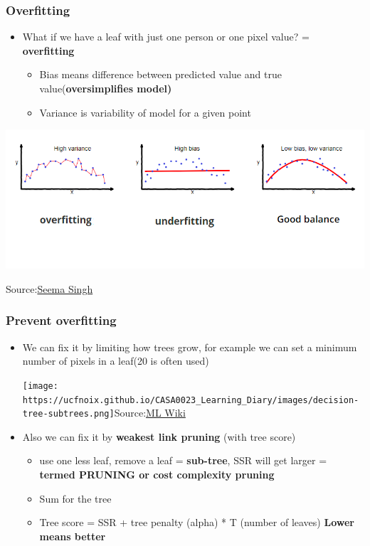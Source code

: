\documentclass[
  letterpaper,
  DIV=11,
  numbers=noendperiod]{scrreprt}
\begin{document}
\hypertarget{overfitting}{%
\subsubsection{Overfitting}\label{overfitting}}

\begin{itemize}
\item
  What if we have a leaf with just one person or one pixel value? =
  \textbf{overfitting}

  \begin{itemize}
  \item
    Bias means difference between predicted value and true
    value(\textbf{oversimplifies model)}
  \item
    Variance is variability of model for a given point
  \end{itemize}
\end{itemize}

\includegraphics{./images/paste-F0B4E05F.png}

Source:\href{https://towardsdatascience.com/understanding-the-bias-variance-tradeoff-165e6942b229}{Seema
Singh}

\hypertarget{prevent-overfitting}{%
\subsubsection{Prevent overfitting}\label{prevent-overfitting}}

\begin{itemize}
\item
  We can fix it by limiting how trees grow, for example we can set a
  minimum number of pixels in a leaf(20 is often used)

  \texttt{[image: https://ucfnoix.github.io/CASA0023\_Learning\_Diary/images/decision-tree-subtrees.png]}Source:\href{http://mlwiki.org/index.php/Cost-Complexity_Pruning}{ML
  Wiki}
\item
  Also we can fix it by \textbf{weakest link pruning} (with tree score)

  \begin{itemize}
  \item
    use one less leaf, remove a leaf = \textbf{sub-tree}, SSR will get
    larger = \textbf{termed PRUNING or cost complexity pruning}
  \item
    Sum for the tree
  \item
    Tree score = SSR + tree penalty (alpha) * T (number of leaves)
    \textbf{Lower means better}
  \end{itemize}
\end{itemize}
\end{document}
